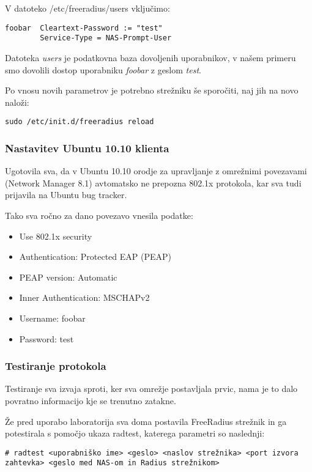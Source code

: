 \documentclass[12pt]{article}
\begin{document}
V datoteko /etc/freeradius/users vključimo:

\begin{verbatim}
foobar  Cleartext-Password := "test"
        Service-Type = NAS-Prompt-User
\end{verbatim}

Datoteka \emph{users} je podatkovna baza dovoljenih uporabnikov, v našem primeru smo dovolili dostop uporabniku \emph{foobar} z geslom \emph{test}.  

Po vnosu novih parametrov je potrebno strežniku še sporočiti, naj jih na novo naloži:

\begin{verbatim}
sudo /etc/init.d/freeradius reload
\end{verbatim}

\subsubsection{Nastavitev Ubuntu 10.10 klienta}

Ugotovila sva, da v Ubuntu 10.10 orodje za upravljanje z omrežnimi povezavami (Network Manager 8.1) avtomatsko ne prepozna 802.1x protokola, kar sva tudi prijavila \cite{ubuntubug} na Ubuntu bug tracker.

Tako sva ročno za dano povezavo vnesila podatke:

\begin{itemize}
  \item Use 802.1x security
  \item Authentication: Protected EAP (PEAP)
  \item PEAP version: Automatic
  \item Inner Authentication: MSCHAPv2
  \item Username: foobar
  \item Password: test
\end{itemize}

\subsubsection{Testiranje protokola}

Testiranje sva izvaja sproti, ker sva omrežje postavljala prvic, nama je to dalo povratno informacijo kje se trenutno zatakne.

Že pred uporabo laboratorija sva doma postavila FreeRadius strežnik in ga potestirala s pomočjo ukaza radtest, katerega parametri so naslednji:
\begin{verbatim}
# radtest <uporabniško ime> <geslo> <naslov strežnika> <port izvora zahtevka> <geslo med NAS-om in Radius strežnikom>
\end{verbatim}
\end{document}
